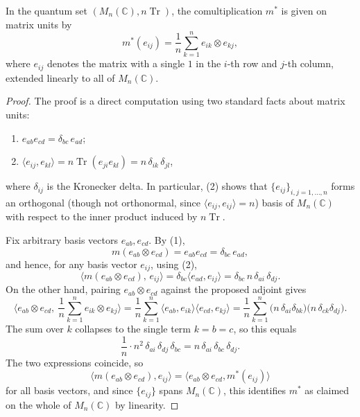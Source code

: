 \begin{lemma}
    \label{lem:comultiplication-matrix-algebras}
    In the quantum set \( (M_n (\mathbb{C}), n\operatorname{Tr}) \), the
    comultiplication \( m^* \) is given on matrix units by
    \[
        m^*(e_{ij}) = \frac{1}{n}\sum_{k=1}^n e_{ik} \otimes e_{kj},
    \]
    where \( e_{ij} \) denotes the matrix with a single \( 1 \) in the
    \( i \)-th row and \( j \)-th column, extended linearly to all of
    \( M_n (\mathbb{C}) \).
\end{lemma}

\begin{proof}
    The proof is a direct computation using two standard facts about
    matrix units:
    \begin{enumerate}
        \item \( e_{ab}e_{cd} = \delta_{bc}\, e_{ad} \);
        \item \( \langle e_{ij}, e_{kl} \rangle =
            n\operatorname{Tr}(e_{ji}e_{kl}) = n\,\delta_{ik}\,\delta_{jl} \),
    \end{enumerate}
    where \( \delta_{ij} \) is the Kronecker delta. In particular, (2)
    shows that \( \{e_{ij}\}_{i,j=1,\dots,n} \) forms an orthogonal
    (though not orthonormal, since \( \langle e_{ij},e_{ij}\rangle = n \))
    basis of \( M_n (\mathbb{C}) \) with respect to the inner product induced by
    \( n\operatorname{Tr} \).

    Fix arbitrary basis vectors \( e_{ab}, e_{cd} \). By (1),
    \[
        m(e_{ab} \otimes e_{cd}) = e_{ab}e_{cd} = \delta_{bc}\, e_{ad},
    \]
    and hence, for any basis vector \( e_{ij} \), using (2),
    \[
        \big\langle m(e_{ab} \otimes e_{cd}),\, e_{ij} \big\rangle
        = \delta_{bc} \big\langle e_{ad}, e_{ij} \big\rangle
        = \delta_{bc}\, n\,\delta_{ai}\,\delta_{dj}.
    \]
    On the other hand, pairing \( e_{ab} \otimes e_{cd} \) against the
    proposed adjoint gives
    \[
        \Big\langle e_{ab} \otimes e_{cd},\ \frac{1}{n}\sum_{k=1}^n e_{ik}
        \otimes e_{kj} \Big\rangle
        = \frac{1}{n}\sum_{k=1}^n \langle e_{ab}, e_{ik} \rangle \langle e_{cd},
        e_{kj} \rangle
        = \frac{1}{n}\sum_{k=1}^n
        \big(n\,\delta_{ai}\delta_{bk}\big)\big(n\,\delta_{ck}\delta_{dj}\big).
    \]
    The sum over \( k \) collapses to the single term \( k = b = c \),
    so this equals
    \[
        \frac{1}{n}\cdot n^2\, \delta_{ai}\,\delta_{dj}\,\delta_{bc}
        = n\,\delta_{ai}\,\delta_{bc}\,\delta_{dj}.
    \]
    The two expressions coincide, so
    \[
        \big\langle m(e_{ab}\otimes e_{cd}), e_{ij} \big\rangle
        = \big\langle e_{ab}\otimes e_{cd}, m^*(e_{ij}) \big\rangle
    \]
    for all basis vectors, and since \( \{e_{ij}\} \) spans \( M_n
    (\mathbb{C}) \),
    this identifies \( m^* \) as claimed on the whole of \( M_n (\mathbb{C}) \)
    by linearity.
\end{proof}

